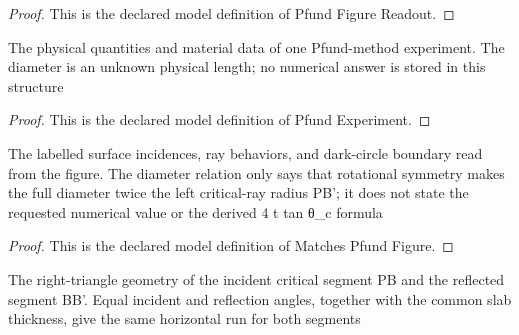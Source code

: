 \begin{proof}
  This is the declared model definition of Pfund Figure Readout.
\end{proof}
\begin{definition}
  \label{def:physics:phyx-mini-0022:phyxminiproblems-problemphyxmini0022-pfundexperiment}
  The physical quantities and material data of one Pfund-method experiment. The diameter is an unknown physical length; no numerical answer is stored in this structure
\end{definition}
\begin{proof}
  This is the declared model definition of Pfund Experiment.
\end{proof}
\begin{definition}
  \label{def:physics:phyx-mini-0022:phyxminiproblems-problemphyxmini0022-matchespfundfigure}
  The labelled surface incidences, ray behaviors, and dark-circle boundary read from the figure. The diameter relation only says that rotational symmetry makes the full diameter twice the left critical-ray radius PB'; it does not state the requested numerical value or the derived 4 t tan θ\_c formula
\end{definition}
\begin{proof}
  This is the declared model definition of Matches Pfund Figure.
\end{proof}
\begin{definition}
  \label{def:physics:phyx-mini-0022:phyxminiproblems-problemphyxmini0022-satisfiescriticalraygeometry}
  The right-triangle geometry of the incident critical segment PB and the reflected segment BB'. Equal incident and reflection angles, together with the common slab thickness, give the same horizontal run for both segments
\end{definition}
